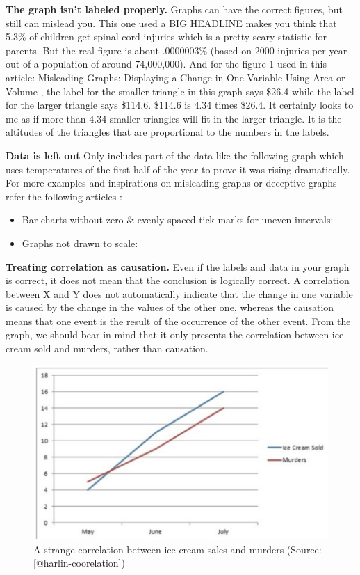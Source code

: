 \documentclass[]{book}
\providecommand{\tightlist}{%
  \setlength{\itemsep}{0pt}\setlength{\parskip}{0pt}}
\theoremstyle{definition}
\theoremstyle{definition}
\theoremstyle{definition}
\theoremstyle{remark}
\begin{document}
\textbf{The graph isn't labeled properly.} Graphs can have the correct
figures, but still can mislead you. This one used a BIG HEADLINE makes
you think that 5.3\% of children get spinal cord injuries which is a
pretty scary statistic for parents. But the real figure is about
.0000003\% (based on 2000 injuries per year out of a population of
around 74,000,000). And for the figure 1 used in this article:
Misleading Graphs: Displaying a Change in One Variable Using Area or
Volume \citep{scaling_issues}, the label for the smaller triangle in
this graph says \$26.4 while the label for the larger triangle says
\$114.6. \$114.6 is 4.34 times \$26.4. It certainly looks to me as if
more than 4.34 smaller triangles will fit in the larger triangle. It is
the altitudes of the triangles that are proportional to the numbers in
the labels.

\textbf{Data is left out} Only includes part of the data like the
following graph which uses temperatures of the first half of the year to
prove it was rising dramatically. For more examples and inspirations on
misleading graphs or deceptive graphs refer the following articles :

\begin{itemize}
\tightlist
\item
  Bar charts without zero \& evenly spaced tick marks for uneven
  intervals: \citep{whats_wrong}
\item
  Graphs not drawn to scale:\citep{scaling_issues}
\end{itemize}

\textbf{Treating correlation as causation.} Even if the labels and data
in your graph is correct, it does not mean that the conclusion is
logically correct. A correlation between X and Y does not automatically
indicate that the change in one variable is caused by the change in the
values of the other one, whereas the causation means that one event is
the result of the occurrence of the other event. From the graph, we
should bear in mind that it only presents the correlation between ice
cream sold and murders, rather than causation.

\begin{figure}
\includegraphics[width=0.7\linewidth]{images/harlin-ice-cream} \caption{A strange correlation between ice cream sales and murders (Source: [@harlin-coorelation])}\label{fig:harlin-ice-cream}
\end{figure}
\end{document}
